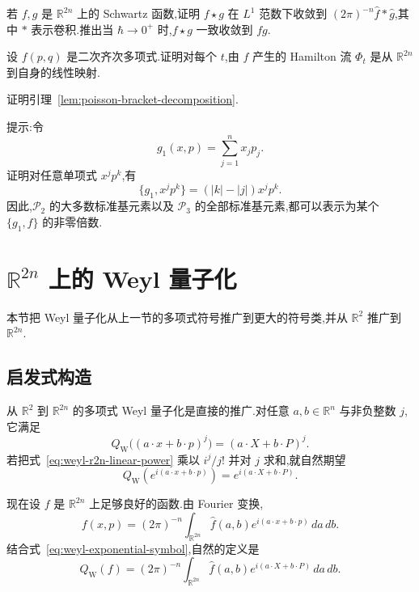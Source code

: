 {\begin{exercise}\label{ex:moyal-classical-limit}
若 $f,g$ 是 $\mathbb R^{2n}$ 上的 Schwartz 函数,证明 $f\star g$ 在 $L^1$ 范数下收敛到 $(2\pi)^{-n}\widehat f*\widehat g$,其中 $*$ 表示卷积.推出当 $\hbar\to0^+$ 时,$f\star g$ 一致收敛到 $fg$.
\end{exercise}

\begin{exercise}[二次 Hamilton 流]\label{ex:quadratic-hamilton-flow}
设 $f(p,q)$ 是二次齐次多项式.证明对每个 $t$,由 $f$ 产生的 Hamilton 流 $\Phi_t$ 是从 $\mathbb R^{2n}$ 到自身的线性映射.
\end{exercise}

\begin{exercise}\label{ex:poisson-bracket-decomposition}
证明引理~\ref{lem:poisson-bracket-decomposition}.

提示:令
\[
g_1(x,p)=\sum_{j=1}^n x_jp_j.
\]
证明对任意单项式 $x^jp^k$,有
\[
\{g_1,x^jp^k\}=(|k|-|j|)x^jp^k.
\]
因此,$\mathcal P_2$ 的大多数标准基元素以及 $\mathcal P_3$ 的全部标准基元素,都可以表示为某个 $\{g_1,f\}$ 的非零倍数.
\end{exercise}

}

\ChapterThirteenSectionTwo

\section{$\mathbb R^{2n}$ 上的 Weyl 量子化}
\label{sec:weyl-r2n}

本节把 Weyl 量子化从上一节的多项式符号推广到更大的符号类,并从 $\mathbb R^2$ 推广到 $\mathbb R^{2n}$.

\subsection{启发式构造}
\label{subsec:weyl-heuristics}

从 $\mathbb R^2$ 到 $\mathbb R^{2n}$ 的多项式 Weyl 量子化是直接的推广.对任意 $a,b\in\mathbb R^n$ 与非负整数 $j$,它满足
\[
Q_{\mathrm W}\bigl((a\cdot x+b\cdot p)^j\bigr)=(a\cdot X+b\cdot P)^j.
\label{eq:weyl-r2n-linear-power}
\]
若把式~\eqref{eq:weyl-r2n-linear-power} 乘以 $i^j/j!$ 并对 $j$ 求和,就自然期望
\[
Q_{\mathrm W}\left(e^{i(a\cdot x+b\cdot p)}\right)=e^{i(a\cdot X+b\cdot P)}.
\label{eq:weyl-exponential-symbol}
\]

现在设 $f$ 是 $\mathbb R^{2n}$ 上足够良好的函数.由 Fourier 变换,
\[
f(x,p)=(2\pi)^{-n}\int_{\mathbb R^{2n}}\widehat f(a,b)e^{i(a\cdot x+b\cdot p)}\,da\,db.
\]
结合式~\eqref{eq:weyl-exponential-symbol},自然的定义是
\[
Q_{\mathrm W}(f)=(2\pi)^{-n}\int_{\mathbb R^{2n}}\widehat f(a,b)e^{i(a\cdot X+b\cdot P)}\,da\,db.
\label{eq:weyl-fourier-definition}
\]

